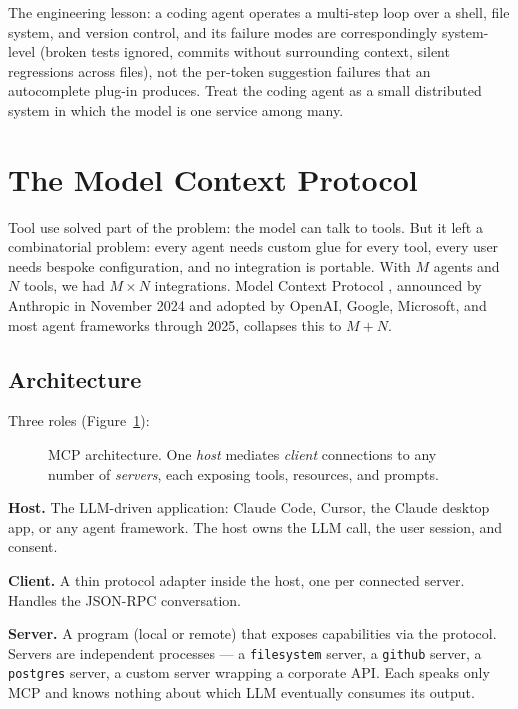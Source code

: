 The engineering lesson: a coding agent operates a multi-step loop
over a shell, file system, and version control, and its failure
modes are correspondingly system-level (broken tests ignored,
commits without surrounding context, silent regressions across
files), not the per-token suggestion failures that an autocomplete
plug-in produces. Treat the coding agent as a small distributed
system in which the model is one service among many.

\section{The Model Context Protocol}

Tool use solved part of the problem: the model can talk to tools.
But it left a combinatorial problem: every agent needs custom
glue for every tool, every user needs bespoke configuration, and
no integration is portable. With $M$ agents and $N$ tools, we had
$M \times N$ integrations. Model Context Protocol
\citep{mcp_spec, mcp_intro}, announced by Anthropic in November
2024 and adopted by OpenAI, Google, Microsoft, and most agent
frameworks through 2025, collapses this to $M + N$.

\subsection{Architecture}

Three roles (Figure~\ref{fig:mcp}):

\begin{figure}[H]
  \centering
  
  \caption{MCP architecture. One \emph{host} mediates
           \emph{client} connections to any number of
           \emph{servers}, each exposing tools, resources, and
           prompts.}
  \label{fig:mcp}
\end{figure}

\textbf{Host.} The LLM-driven application: Claude Code, Cursor,
the Claude desktop app, or any agent framework. The host owns
the LLM call, the user session, and consent.

\textbf{Client.} A thin protocol adapter inside the host, one
per connected server. Handles the JSON-RPC conversation.

\textbf{Server.} A program (local or remote) that exposes
capabilities via the protocol. Servers are independent processes
--- a \texttt{filesystem} server, a \texttt{github} server, a
\texttt{postgres} server, a custom server wrapping a corporate
API. Each speaks only MCP and knows nothing about which LLM
eventually consumes its output.

